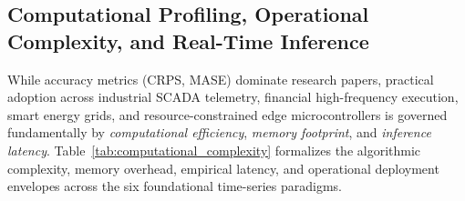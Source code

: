 \subsection{Computational Profiling, Operational Complexity, and Real-Time Inference}
\label{sec:computational_profiling}

While accuracy metrics (CRPS, MASE) dominate research papers, practical adoption across industrial SCADA telemetry, financial high-frequency execution, smart energy grids, and resource-constrained edge microcontrollers is governed fundamentally by \emph{computational efficiency}, \emph{memory footprint}, and \emph{inference latency}. Table~\ref{tab:computational_complexity} formalizes the algorithmic complexity, memory overhead, empirical latency, and operational deployment envelopes across the six foundational time-series paradigms.

